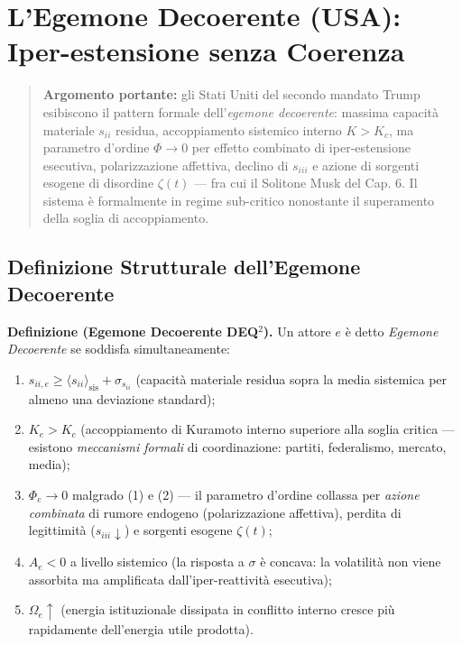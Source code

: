 \chapter{L'Egemone Decoerente (USA): Iper-estensione senza
Coerenza}\label{legemone-decoerente-usa-iper-estensione-senza-coerenza}

\begin{quote}
\textbf{Argomento portante:} gli Stati Uniti del secondo mandato Trump
esibiscono il pattern formale dell'\emph{egemone decoerente}: massima
capacità materiale \(s_{ii}\) residua, accoppiamento sistemico interno
\(K > K_c\), ma parametro d'ordine \(\Phi \to 0\) per effetto combinato
di iper-estensione esecutiva, polarizzazione affettiva, declino di
\(s_{iii}\) e azione di sorgenti esogene di disordine \(\zeta(t)\) ---
fra cui il Solitone Musk del Cap. 6. Il sistema è formalmente in regime
sub-critico nonostante il superamento della soglia di accoppiamento.
\end{quote}



\section{Definizione Strutturale dell'Egemone
Decoerente}\label{definizione-strutturale-dellegemone-decoerente}

\Hypoth{} \textbf{Definizione (Egemone Decoerente DEQ$^2$).} Un attore
\(e\) è detto \emph{Egemone Decoerente} se soddisfa simultaneamente:

\begin{enumerate}
\def\labelenumi{\arabic{enumi}.}
\tightlist
\item
  \(s_{ii,e} \geq \langle s_{ii} \rangle_{\text{sis}} + \sigma_{s_{ii}}\)
  (capacità materiale residua sopra la media sistemica per almeno una
  deviazione standard);
\item
  \(K_e > K_c\) (accoppiamento di Kuramoto interno superiore alla soglia
  critica --- esistono \emph{meccanismi formali} di coordinazione:
  partiti, federalismo, mercato, media);
\item
  \(\Phi_e \to 0\) malgrado (1) e (2) --- il parametro d'ordine collassa
  per \emph{azione combinata} di rumore endogeno (polarizzazione
  affettiva), perdita di legittimità (\(s_{iii} \downarrow\)) e sorgenti
  esogene \(\zeta(t)\);
\item
  \(A_e < 0\) a livello sistemico (la risposta a \(\sigma\) è concava:
  la volatilità non viene assorbita ma amplificata dall'iper-reattività
  esecutiva);
\item
  \(\Omega_e \uparrow\) (energia istituzionale dissipata in conflitto
  interno cresce più rapidamente dell'energia utile prodotta).
\end{enumerate}

